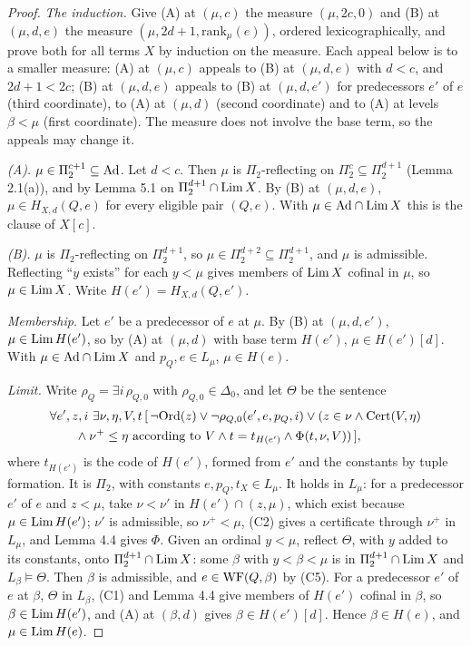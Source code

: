 \documentclass[11pt]{article}
\begin{document}
\begin{proof}
\emph{The induction.} Give (A) at $(\mu, c)$ the measure $(\mu, 2c, 0)$ and (B) at $(\mu, d, e)$ the measure $(\mu, 2d +
1, \mathrm{rank}_\mu(e))$, ordered lexicographically, and prove both for all terms $X$ by induction on the measure. Each
appeal below is to a smaller measure: (A) at $(\mu, c)$ appeals to (B) at $(\mu, d, e)$ with $d < c$, and $2d + 1 < 2c$;
(B) at $(\mu, d, e)$ appeals to (B) at $(\mu, d, e')$ for predecessors $e'$ of $e$ (third coordinate), to (A) at $(\mu,
d)$ (second coordinate) and to (A) at levels $\beta < \mu$ (first coordinate). The measure does not involve the base
term, so the appeals may change it.

\emph{(A).} $\mu \in \Pi_2^{c+1} \subseteq \mathrm{Ad}$. Let $d < c$. Then $\mu$ is $\Pi_2$-reflecting on $\Pi_2^{c} \subseteq
\Pi_2^{d+1}$ (Lemma 2.1(a)), and by Lemma 5.1 on $\Pi_2^{d+1} \cap \mathrm{Lim}\, X$. By (B) at $(\mu, d, e)$, $\mu \in H_{X,d}(Q, e)$
for every eligible pair $(Q,e)$. With $\mu \in \mathrm{Ad} \cap \mathrm{Lim}\, X$ this is the clause of $X[c]$.

\emph{(B).} $\mu$ is $\Pi_2$-reflecting on $\Pi_2^{d+1}$, so $\mu \in \Pi_2^{d+2} \subseteq \Pi_2^{d+1}$, and $\mu$ is
admissible. Reflecting ``$y$ exists'' for each $y < \mu$ gives members of $\mathrm{Lim}\, X$ cofinal in $\mu$, so $\mu \in \mathrm{Lim}\,
X$. Write $H(e') = H_{X,d}(Q, e')$.

\emph{Membership.} Let $e'$ be a predecessor of $e$ at $\mu$. By (B) at $(\mu, d, e')$, $\mu \in \mathrm{Lim}\, H(e')$, so by (A)
at $(\mu, d)$ with base term $H(e')$, $\mu \in H(e')[d]$. With $\mu \in \mathrm{Ad} \cap \mathrm{Lim}\, X$ and $p_Q, e \in L_\mu$, $\mu \in
H(e)$.

\emph{Limit.} Write $\rho_Q = \exists i\, \rho_{Q,0}$ with $\rho_{Q,0} \in \Delta_0$, and let $\Theta$ be the sentence
\[ \begin{aligned} & \forall e', z, i\ \exists \nu, \eta, V, t\, [\, \neg\mathrm{Ord}(z) \vee \neg\rho_{Q,0}(e', e,
   p_Q, i) \vee (z \in \nu \wedge \mathrm{Cert}(V,\eta) \\ & \qquad \wedge \nu^+ \le \eta \text{ according to } V \wedge t =
   t_{H(e')} \wedge \Phi(t, \nu, V))\,], \end{aligned} \]
where $t_{H(e')}$ is the code of $H(e')$, formed from $e'$ and the constants by tuple formation. It is $\Pi_2$, with
constants $e, p_Q, t_X \in L_\mu$. It holds in $L_\mu$: for a predecessor $e'$ of $e$ and $z < \mu$, take $\nu < \nu'$
in $H(e') \cap (z, \mu)$, which exist because $\mu \in \mathrm{Lim}\, H(e')$; $\nu'$ is admissible, so $\nu^+ < \mu$, (C2) gives a
certificate through $\nu^+$ in $L_\mu$, and Lemma 4.4 gives $\Phi$. Given an ordinal $y < \mu$, reflect $\Theta$, with
$y$ added to its constants, onto $\Pi_2^{d+1} \cap \mathrm{Lim}\, X$: some $\beta$ with $y < \beta < \mu$ is in $\Pi_2^{d+1} \cap \mathrm{Lim}\,
X$ and $L_\beta \models \Theta$. Then $\beta$ is admissible, and $e \in \mathrm{WF}(Q, \beta)$ by (C5). For a predecessor $e'$
of $e$ at $\beta$, $\Theta$ in $L_\beta$, (C1) and Lemma 4.4 give members of $H(e')$ cofinal in $\beta$, so $\beta \in
\mathrm{Lim}\, H(e')$, and (A) at $(\beta, d)$ gives $\beta \in H(e')[d]$. Hence $\beta \in H(e)$, and $\mu \in \mathrm{Lim}\, H(e)$.
\end{proof}
\end{document}
